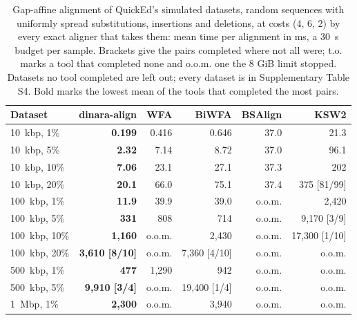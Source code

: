 \documentclass[nocrop,noinfo]{bioinfo}
\begin{document}
\begin{table}[t]
\caption{Gap-affine alignment of QuickEd's simulated datasets, random sequences with uniformly spread substitutions, insertions and deletions, at costs (4, 6, 2) by every exact aligner that takes them: mean time per alignment in ms, a 30~s budget per sample. Brackets give the pairs completed where not all were; t.o. marks a tool that completed none and o.o.m. one the 8 GiB limit stopped. Datasets no tool completed are left out; every dataset is in Supplementary Table S4. Bold marks the lowest mean of the tools that completed the most pairs.}\label{tab:affine_sim}
\centering\footnotesize
\setlength{\tabcolsep}{4pt}
\begin{tabular}{@{}lrrrrr@{}}
\toprule
Dataset & dinara-align & WFA & BiWFA & BSAlign & KSW2 \\
\midrule
10~kbp, 1\% & \textbf{0.199} & 0.416 & 0.646 & 37.0 & 21.3 \\
10~kbp, 5\% & \textbf{2.32} & 7.14 & 8.72 & 37.0 & 96.1 \\
10~kbp, 10\% & \textbf{7.06} & 23.1 & 27.1 & 37.3 & 202 \\
10~kbp, 20\% & \textbf{20.1} & 66.0 & 75.1 & 37.4 & 375 [81/99] \\
100~kbp, 1\% & \textbf{11.9} & 39.9 & 39.0 & o.o.m. & 2{,}420 \\
100~kbp, 5\% & \textbf{331} & 808 & 714 & o.o.m. & 9{,}170 [3/9] \\
100~kbp, 10\% & \textbf{1{,}160} & o.o.m. & 2{,}430 & o.o.m. & 17{,}300 [1/10] \\
100~kbp, 20\% & \textbf{3{,}610 [8/10]} & o.o.m. & 7{,}360 [4/10] & o.o.m. & o.o.m. \\
500~kbp, 1\% & \textbf{477} & 1{,}290 & 942 & o.o.m. & o.o.m. \\
500~kbp, 5\% & \textbf{9{,}910 [3/4]} & o.o.m. & 19{,}400 [1/4] & o.o.m. & o.o.m. \\
1~Mbp, 1\% & \textbf{2{,}300} & o.o.m. & 3{,}940 & o.o.m. & o.o.m. \\
\bottomrule
\end{tabular}
\end{table}
\end{document}
